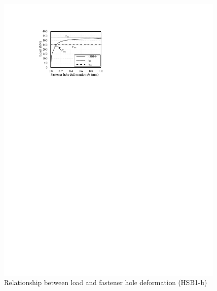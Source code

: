 \begin{figure}[htbp]
\begin{minipage}[t]{0.48\textwidth}
    \includegraphics{imgs/ch4/lfhd-ch4.pdf}
    \caption{Relationship between load and fastener hole deformation (HSB1-b)}
    \label{fig-lfhd-ch4}
    \end{minipage}
    \begin{minipage}[t]{0.48\textwidth}

\end{minipage}
\end{figure}

